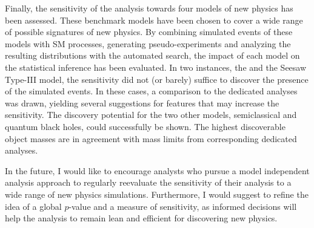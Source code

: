 Finally, the sensitivity of the analysis towards four models of new physics has been assessed. These benchmark models have been chosen to cover a wide range of possible signatures of new physics. By combining simulated events of these models with \acl{SM} processes, generating pseudo-experiments and analyzing the resulting distributions with the automated search, the impact of each model on the statistical inference has been evaluated. 
In two instances, the \PWprime and the Seesaw Type-III model,  the sensitivity did not (or barely) suffice to discover the presence of the simulated events. In these cases, a comparison to the dedicated analyses was drawn, yielding several suggestions for features that may increase the sensitivity.
The discovery potential for the two other models, semiclassical and quantum black holes, could successfully be shown. The highest discoverable object masses are in agreement with mass limits from corresponding dedicated analyses.

In the future, I would like to encourage analysts who pursue a model independent analysis approach to regularly reevaluate the sensitivity of their analysis to a wide range of new physics simulations. Furthermore, I would suggest to refine the idea of a global $p$-value and a measure of sensitivity, as informed decisions will help the analysis to remain lean and efficient for discovering new physics.

